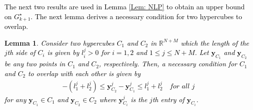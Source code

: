 \documentclass[10pt,twocolumn,twoside]{IEEEtran}
\newtheorem{lemma}{Lemma}
\begin{document}
\textcolor{black}{The next two results are used in Lemma \ref{Lem: NLP} to obtain an upper bound on $G^\star_{k+1}$. The next lemma derives a necessary condition for two hypercubes to overlap.}
\begin{lemma}\label{Lem: HQC}
\textcolor{black}{Consider two hypercubes $C_1$ and $C_2$ in ${\ensuremath{{\ensuremath{\mathbb{{R}}}}}}^{N+M}$ which the length of the $j$th side of $C_i$ is given by $l_i^j>0$ for $i=1,2$ and $1\leq j\leq N+M$. Let ${\ensuremath{\boldsymbol{{y}}}}_{C_1}$ and ${\ensuremath{\boldsymbol{{y}}}}_{C_2}$ be any two points in $C_1$ and $C_2$, respectively. Then, a necessary condition for $C_1$ and $C_2$  to overlap with each other is given by 
\begin{align}
-{\left({l^j_1+l^j_2}\right)}\leq {\ensuremath{\boldsymbol{{y}}}}^j_{C_2}-{\ensuremath{\boldsymbol{{y}}}}^j_{C_1}\leq l^j_1+l^j_2 \quad \textit{for all $j$}\nonumber
\end{align}
for any ${\ensuremath{\boldsymbol{{y}}}}_{C_1}\in C_1$ and ${\ensuremath{\boldsymbol{{y}}}}_{C_2}\in C_2$ where ${\ensuremath{\boldsymbol{{y}}}}^j_{C_i}$ is the $j$th entry of  ${\ensuremath{\boldsymbol{{y}}}}_{C_i}$.}
 \end{lemma}
\end{document}
